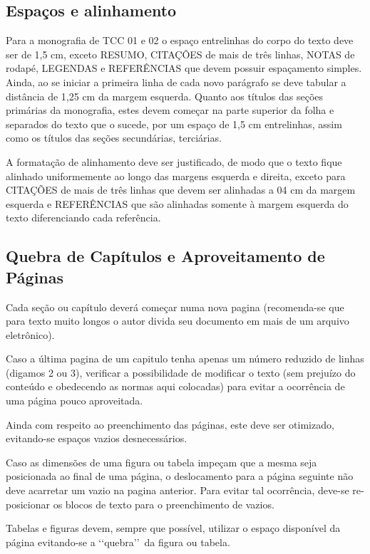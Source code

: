 \subsection{Espaços e alinhamento}

Para a monografia de TCC 01 e 02 o espaço entrelinhas do corpo do texto deve ser de 1,5 cm, exceto RESUMO, CITAÇÔES de mais de três linhas, NOTAS  de rodapé, LEGENDAS e REFERÊNCIAS que devem possuir espaçamento simples. 
Ainda, ao se iniciar a primeira linha de cada novo parágrafo se deve 
tabular a distância de 1,25 cm da margem esquerda. Quanto aos títulos das seções primárias da monografia, estes devem começar 
na parte superior da folha e separados do texto que o sucede, por um espaço de 1,5 cm entrelinhas, assim como os títulos das seções secundárias, terciárias. 

A formatação de alinhamento deve ser justificado, de modo que o texto fique  alinhado uniformemente ao longo das margens esquerda e direita, exceto para CITAÇÕES de mais de três linhas que devem ser alinhadas a 04 cm da margem esquerda e REFERÊNCIAS que são alinhadas somente à margem esquerda do texto diferenciando cada referência.

\subsection{Quebra de Capítulos e Aproveitamento de Páginas}

Cada seção ou capítulo deverá começar numa nova pagina (recomenda-se que para texto muito longos o autor divida seu documento em mais de um arquivo eletrônico). 

Caso a última pagina de um capitulo tenha apenas um número reduzido de 
linhas (digamos 2 ou 3), verificar a possibilidade de modificar o texto (sem prejuízo do conteúdo e obedecendo as normas aqui colocadas) para 
evitar a ocorrência de uma página pouco aproveitada.

Ainda com respeito ao preenchimento das páginas, este deve ser otimizado, evitando-se espaços vazios desnecessários. 

Caso as dimensões de uma figura ou tabela impeçam que a mesma seja 
posicionada ao final de uma página, o deslocamento para a página seguinte não deve acarretar um vazio na pagina anterior. Para evitar tal ocorrência, deve-se re-posicionar os blocos de texto para o preenchimento de vazios. 

Tabelas e figuras devem, sempre que possível, utilizar o espaço disponível da página evitando-se a \lq\lq quebra\rq\rq\ da figura ou tabela. 

